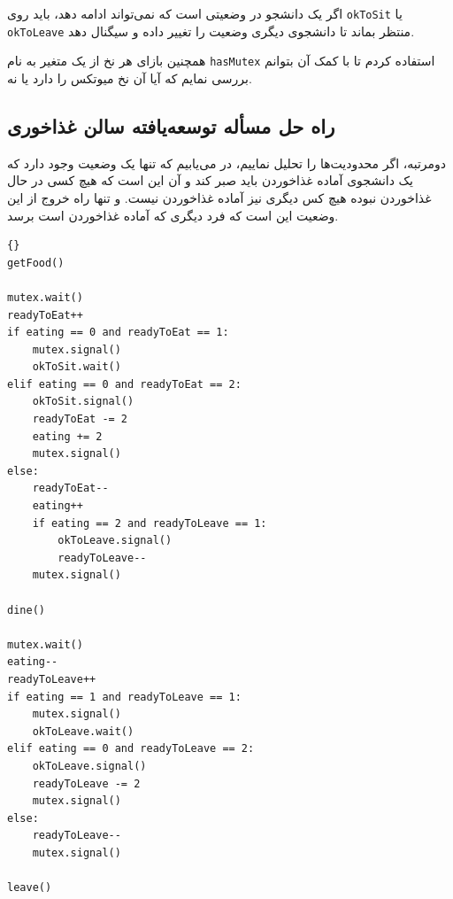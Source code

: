 \documentclass{book}
\newcommand{\clearemptydoublepage}{\newpage\cleardoublepage}
\begin{document}
    اگر یک دانشجو در وضعیتی است که نمی‌تواند ادامه دهد، باید روی {\tt okToSit} یا {\tt okToLeave} منتظر بماند تا دانشجوی دیگری 
    وضعیت را تغییر داده و سیگنال دهد. 

    همچنین بازای هر نخ از یک متغیر به نام {\tt hasMutex} استفاده کردم تا با کمک آن بتوانم بررسی نمایم که آیا آن نخ میوتکس را دارد یا نه. 

\clearemptydoublepage
\subsection{راه حل مسأله توسعه‌یافته سالن غذاخوری}

    دومرتبه، اگر محدودیت‌ها را تحلیل نماییم، در می‌یابیم که تنها یک وضعیت وجود دارد که یک دانشجوی آماده غذاخوردن باید صبر کند و آن این است که 
    هیچ کسی در حال غذاخوردن نبوده هیچ کس دیگری نیز آماده غذاخوردن نیست. و تنها راه خروج از این وضعیت این است که فرد دیگری که آماده غذاخوردن است 
    برسد. 

\begin{latin}
\begin{lstlisting}[title=\rl{راه حل مسأله توسعه‌یافته سالن غذاخوری}]{}
getFood()

mutex.wait()
readyToEat++
if eating == 0 and readyToEat == 1:
    mutex.signal()
    okToSit.wait()
elif eating == 0 and readyToEat == 2:
    okToSit.signal()
    readyToEat -= 2
    eating += 2
    mutex.signal()
else:
    readyToEat--
    eating++
    if eating == 2 and readyToLeave == 1:
        okToLeave.signal()
        readyToLeave--
    mutex.signal()

dine()

mutex.wait()
eating--
readyToLeave++
if eating == 1 and readyToLeave == 1:
    mutex.signal()
    okToLeave.wait()
elif eating == 0 and readyToLeave == 2:
    okToLeave.signal()
    readyToLeave -= 2
    mutex.signal()
else:
    readyToLeave--
    mutex.signal()

leave()
\end{lstlisting}
\end{latin}
\end{document}
